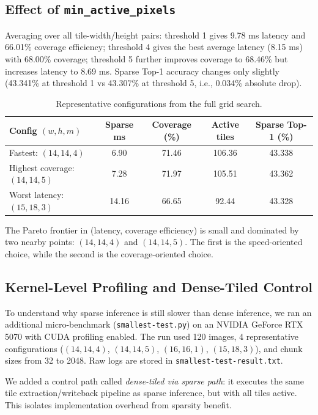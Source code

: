 \subsection{Effect of \texttt{min\_active\_pixels}}
Averaging over all tile-width/height pairs:
threshold 1 gives 9.78 ms latency and 66.01\% coverage efficiency;
threshold 4 gives the best average latency (8.15 ms) with 68.00\% coverage;
threshold 5 further improves coverage to 68.46\% but increases latency to 8.69 ms.
Sparse Top-1 accuracy changes only slightly (43.341\% at threshold 1 vs 43.307\% at threshold 5, i.e., 0.034\% absolute drop).

\begin{table}[t]
\centering
\caption{Representative configurations from the full grid search.}
\label{tab:eval-best-configs}
\begin{tabular}{lcccc}
\hline
Config $(w,h,m)$ & Sparse ms & Coverage (\%) & Active tiles & Sparse Top-1 (\%) \\
\hline
Fastest: $(14,14,4)$ & 6.90 & 71.46 & 106.36 & 43.338 \\
Highest coverage: $(14,14,5)$ & 7.28 & 71.97 & 105.51 & 43.362 \\
Worst latency: $(15,18,3)$ & 14.16 & 66.65 & 92.44 & 43.328 \\
\hline
\end{tabular}
\end{table}

The Pareto frontier in (latency, coverage efficiency) is small and dominated by two nearby points:
$(14,14,4)$ and $(14,14,5)$.
The first is the speed-oriented choice, while the second is the coverage-oriented choice.

\subsection{Kernel-Level Profiling and Dense-Tiled Control}
To understand why sparse inference is still slower than dense inference, we ran an additional micro-benchmark
(\texttt{smallest-test.py}) on an NVIDIA GeForce RTX 5070 with CUDA profiling enabled.
The run used 120 images, 4 representative configurations
($(14,14,4)$, $(14,14,5)$, $(16,16,1)$, $(15,18,3)$),
and chunk sizes from 32 to 2048.
Raw logs are stored in \texttt{smallest-test-result.txt}.

We added a control path called \textit{dense-tiled via sparse path}:
it executes the same tile extraction/writeback pipeline as sparse inference, but with all tiles active.
This isolates implementation overhead from sparsity benefit.

